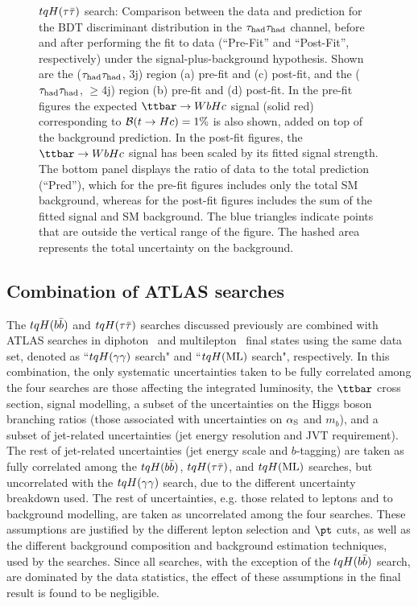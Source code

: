 \begin{figure}[htbp]
\begin{center}
\caption{\small{$tqH(\tau\bar{\tau})$ search: Comparison between the data and prediction for the BDT discriminant distribution in the 
$\tau_{\mathrm{had}} \tau_{\mathrm{had}}$ channel, before and after performing the fit to data  (``Pre-Fit'' and ``Post-Fit'', respectively) under the signal-plus-background hypothesis.
Shown are the ($\tau_{\mathrm{had}} \tau_{\mathrm{had}}$, 3j) region (a) pre-fit and (c) post-fit, and the ($\tau_{\mathrm{had}} \tau_{\mathrm{had}}$, $\geq$4j) region (b) pre-fit and (d) post-fit.
In the pre-fit figures the expected $\Hc$ signal (solid red) corresponding to $\mathcal{B}(t\to Hc)=1\%$ is also shown,
added on top of the background prediction. In the post-fit figures, the $\Hc$ signal has been scaled by its fitted signal strength.
The bottom panel displays the ratio of data to the total prediction (``Pred''), which for the pre-fit figures includes only the total SM background,
whereas for the post-fit figures includes the sum of the fitted signal and SM background.
The blue triangles indicate points that are outside the vertical range of the figure. 
The hashed area represents the total uncertainty on the background. }}
\label{fig:prepostfit_unblinded_WbHc_hh}
\end{center}
\end{figure}

\subsection{Combination of ATLAS searches}
\label{sec:results_combo}

The $tqH(b\bar{b})$ and $tqH(\tau\bar{\tau})$ searches discussed previously are combined with ATLAS searches in 
diphoton~\cite{Aaboud:2017mfd} and multilepton~\cite{Aaboud:2018pob} final states using the same data set, 
denoted as ``$tqH(\gamma\gamma)$ search" and ``$tqH(\mathrm{ML})$ search", respectively.
In this combination, the only systematic uncertainties taken to be fully correlated among the four searches are 
those affecting the integrated luminosity, the $\ttbar$ cross section, signal modelling, a subset of the uncertainties
on the Higgs boson branching ratios (those associated with uncertainties on $\alpha_{\rm S}$ and $m_b$), 
and a subset of jet-related uncertainties (jet energy resolution and JVT requirement). 
The rest of jet-related uncertainties (jet energy scale and $b$-tagging) are taken as fully correlated among 
the $tqH(b\bar{b})$, $tqH(\tau\bar{\tau})$, and $tqH(\mathrm{ML})$ searches, but uncorrelated with the $tqH(\gamma\gamma)$ search, due to the different
uncertainty breakdown used. The rest of uncertainties, e.g. those related to leptons and to background modelling, are taken
as uncorrelated among the four searches. These assumptions are justified by the different lepton selection and $\pt$ cuts, 
as well as the different background composition and background estimation techniques, used by the searches.
Since all searches,  with the exception of the $tqH(b\bar{b})$ search, are dominated 
by the data statistics, the effect of these assumptions in the final result is found to be negligible.

